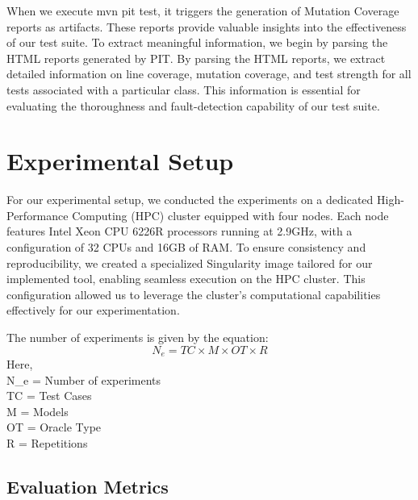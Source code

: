 When we execute mvn pit test, it triggers the generation of Mutation Coverage reports as artifacts. These reports provide valuable insights into the effectiveness of our test suite. To extract meaningful information, we begin by parsing the HTML reports generated by PIT. By parsing the HTML reports, we extract detailed information on line coverage, mutation coverage, and test strength for all tests associated with a particular class. This information is essential for evaluating the thoroughness and fault-detection capability of our test suite.

\section{Experimental Setup}
\label{sec:experimental_setup}
\vspace{0.2 cm}

For our experimental setup, we conducted the experiments on a dedicated High-Performance Computing (HPC) cluster equipped with four nodes. Each node features Intel Xeon CPU 6226R\cite{noauthor_intel_nodate} processors running at 2.9GHz, with a configuration of 32 CPUs and 16GB of RAM. To ensure consistency and reproducibility, we created a specialized Singularity\cite{noauthor_introduction_nodate} image tailored for our implemented tool, enabling seamless execution on the HPC cluster. This configuration allowed us to leverage the cluster's computational capabilities effectively for our experimentation.

The number of experiments is given by the equation:
\[
N_e = TC \times M \times OT \times R
\]
\noindent
Here, \\
N_e = Number of experiments\\
TC = Test Cases\\
M = Models\\
OT = Oracle Type\\
R = Repetitions\\
\vspace{0.1 cm}
\subsection{Evaluation Metrics}
\label{sec:evaluation_metrics}
\vspace{0.1 cm}

